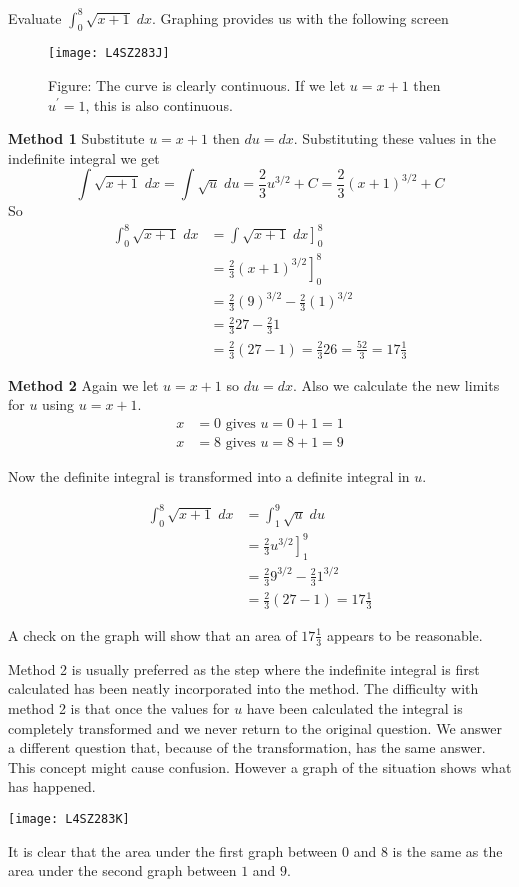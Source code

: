\example Evaluate $\int _{0}^{8}\sqrt{x +1}\; d x$. Graphing provides us with the following screen 
\begin{SCfigure}[1][h]
	\texttt{[image: L4SZ283J]}
	\caption*{Figure: The curve is clearly continuous. If we let $u =x +1$ then $u^{ \prime } =1$, this is also continuous.}
\end{SCfigure}

\solution
\textbf{Method 1} 
Substitute $u =x +1$ then $d u =d x$. Substituting these values in the indefinite integral we get
\begin{equation*}\int \sqrt{x +1}\; d x =\int \sqrt{u}\; d u =\frac{2}{3} u^{3/2} +C =\frac{2}{3} \left (x +1\right )^{3/2} +C
\end{equation*}So
\begin{align*}\int _{0}^{8}\sqrt{x +1}\; d x &  = \left .\int \sqrt{x +1}\; d x\right ]_{0}^{8} \\
 &  = \left .\frac{2}{3} \left (x +1\right )^{3/2}\right ]_{0}^{8} \\
 &  = \frac{2}{3} \left (9\right )^{3/2} -\frac{2}{3} \left (1\right )^{3/2} \\
 &  = \frac{2}{3} 27 -\frac{2}{3} 1 \\
 &  = \frac{2}{3} \left (27 -1\right ) =\frac{2}{3} 26 =\frac{52}{3} =17\frac{1}{3}\end{align*}

\textbf{Method 2} 
Again we let $u =x +1$ so $d u =d x$. Also we calculate the new limits for $u$ using $u =x +1$.
\begin{align*}x &  = 0\text{ gives }u =0 +1 =1 \\
x &  = 8\text{ gives }u =8 +1 =9\end{align*}

Now the definite integral is transformed into a definite integral in $u$. 

\begin{align*}\int _{0}^{8}\sqrt{x +1}\; d x &  = \int _{1}^{9}\sqrt{u}\; d u \\
 &  = \left .\frac{2}{3} u^{3/2}\right ]_{1}^{9} \\
 &  = \frac{2}{3} 9^{3/2} -\frac{2}{3} 1^{3/2} \\
 &  = \frac{2}{3} \left (27 -1\right ) =17\frac{1}{3}\end{align*}

A check on the graph will show that an area of $17\frac{1}{3}$ appears to be reasonable. 

Method 2 is usually preferred as the step where the indefinite integral is first calculated has been neatly incorporated into the method. The difficulty with method 2 is that once the values for $u$ have been calculated the integral is completely transformed and we never return to the original question. We answer a different question that, because of the transformation, has the same answer. This concept might cause confusion. However a graph of the situation shows what has happened.   
\begin{center}\texttt{[image: L4SZ283K]}\end{center}
It is clear that the area under the first graph between $0$ and $8$ is the same as the area under the second graph between $1$ and $9$. 

